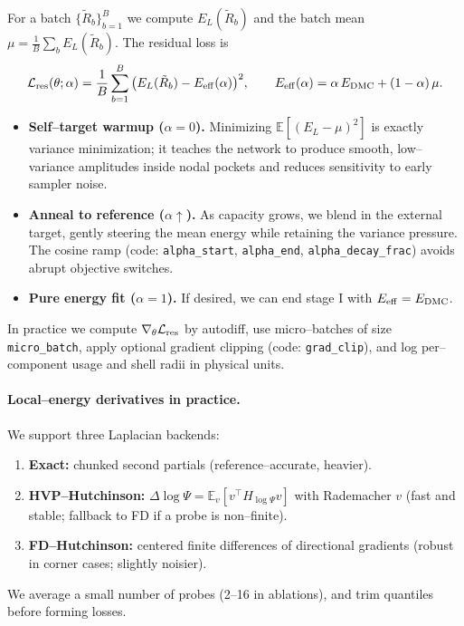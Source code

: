 For a batch $\{\tilde R_b\}_{b=1}^B$ we compute $E_L(\tilde R_b)$ and the batch mean $\mu=\frac{1}{B}\sum_b E_L(\tilde R_b)$.
The residual loss is
\begin{equation}
\mathcal{L}_{\rm res}(\theta; \alpha)
= \frac{1}{B}\sum_{b=1}^B \big(E_L(\tilde R_b)-E_{\rm eff}(\alpha)\big)^2,
\qquad
E_{\rm eff}(\alpha)=\alpha\,E_{\rm DMC}+(1-\alpha)\,\mu.
\end{equation}
\begin{itemize}
  \item \textbf{Self–target warmup ($\alpha=0$).} Minimizing $\mathbb{E}[(E_L-\mu)^2]$ is exactly variance minimization; it teaches the network to produce smooth, low–variance amplitudes inside nodal pockets and reduces sensitivity to early sampler noise.
  \item \textbf{Anneal to reference ($\alpha\uparrow$).} As capacity grows, we blend in the external target, gently steering the mean energy while retaining the variance pressure. The cosine ramp (code: \texttt{alpha\_start}, \texttt{alpha\_end}, \texttt{alpha\_decay\_frac}) avoids abrupt objective switches.
  \item \textbf{Pure energy fit ($\alpha=1$).} If desired, we can end stage I with $E_{\rm eff}=E_{\rm DMC}$.
\end{itemize}
In practice we compute $\nabla_\theta \mathcal{L}_{\rm res}$ by autodiff, use micro–batches of size \texttt{micro\_batch}, apply optional gradient clipping (code: \texttt{grad\_clip}), and log per–component usage and shell radii in physical units.

\paragraph{Local–energy derivatives in practice.}
We support three Laplacian backends:
\begin{enumerate}
  \item \textbf{Exact:} chunked second partials (reference–accurate, heavier).
  \item \textbf{HVP–Hutchinson:} $\Delta \log\Psi = \mathbb{E}_v[v^\top H_{\log\Psi} v]$ with Rademacher $v$ (fast and stable; fallback to FD if a probe is non–finite).
  \item \textbf{FD–Hutchinson:} centered finite differences of directional gradients (robust in corner cases; slightly noisier).
\end{enumerate}
We average a small number of probes (2–16 in ablations), and trim quantiles before forming losses.

